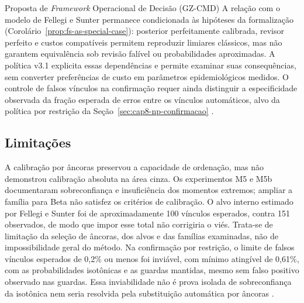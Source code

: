 \begin{chapter}{Proposta de \textit{Framework} Operacional de Decisão (GZ-CMD)}
A relação com o modelo de Fellegi e Sunter permanece condicionada às hipóteses da formalização (Corolário~\ref{prop:fs-as-special-case}): posterior perfeitamente calibrada, revisor perfeito e custos compatíveis permitem reproduzir limiares clássicos, mas não garantem equivalência sob revisão falível ou probabilidades aproximadas. A política v3.1 explicita essas dependências e permite examinar suas consequências, sem converter preferências de custo em parâmetros epidemiológicos medidos. O controle de falsos vínculos na confirmação requer ainda distinguir a especificidade observada da fração esperada de erros entre os vínculos automáticos, alvo da política por restrição da Seção~\ref{sec:cap8-np-confirmacao} \cite{Fellegi1969theory,Jardim2026phdrepo}.

\subsection{Limitações}
\label{sec:cap8-limitacoes}

A calibração por âncoras preservou a capacidade de ordenação, mas não demonstrou calibração absoluta na área cinza. Os experimentos M5 e M5b documentaram sobreconfiança e insuficiência dos momentos extremos; ampliar a família para Beta não satisfez os critérios de calibração. O alvo interno estimado por Fellegi e Sunter foi de aproximadamente 100 vínculos esperados, contra 151 observados, de modo que impor esse total não corrigiria o viés. Trata-se de limitação da seleção de âncoras, dos alvos e das famílias examinadas, não de impossibilidade geral do método. Na confirmação por restrição, o limite de falsos vínculos esperados de 0,2\% ou menos foi inviável, com mínimo atingível de 0,61\%, com as probabilidades isotônicas e as guardas mantidas, mesmo sem falso positivo observado nas guardas. Essa inviabilidade não é prova isolada de sobreconfiança da isotônica nem seria resolvida pela substituição automática por âncoras \cite{Jardim2026phdrepo}.


\end{chapter}
